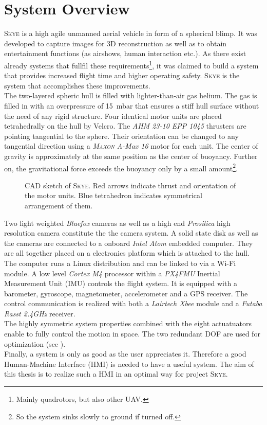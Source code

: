 \section{System Overview}
\label{sec:system overview}
\textsc{Skye} is a high agile unmanned aerial vehicle in form of a spherical blimp. It was developed to capture images for 3D reconstruction as well as to obtain entertainment functions (as airshows, human interaction etc.). As there exist already systems that fullfil these requirements\footnote{Mainly quadrotors, but also other UAV.}, it was claimed to build a system that provides increased flight time and higher operating safety. \textsc{Skye} is the system that accomplishes these improvements. \\
The two-layered spheric hull is filled with lighter-than-air gas helium. The gas is filled in with an overpressure of \SI{15}{\milli\bar} that ensures a stiff hull surface without the need of any rigid structure. Four identical motor units are placed tetrahedrally on the hull by Velcro. The \textit{AHM 23-10 EPP 1045} thrusters are pointing tangential to the sphere. Their orientation can be changed to any tangential direction using a \textit{\textsc{Maxon} A-Max 16} motor for each unit. The center of gravity is approximately at the same position as the center of buoyancy. Further on, the gravitational force exceeds the buoyancy only by a small amount\footnote{So the system sinks slowly to ground if turned off.}.
\begin{figure}[H]
    \centering
    \def\svgwidth{0.8\columnwidth}
    
    \caption{CAD sketch of \textsc{Skye}. Red arrows indicate thrust and orientation of the motor units. Blue tetrahedron indicates symmetrical arrangement of them. }
    \label{fig:scene_trajectoryFollowing}
\end{figure}
Two light weighted \textit{Bluefox} cameras as well as a high end \textit{Prosilica} high resolution camera constitute the the camera system. A solid state disk as well as the cameras are connected to a onboard \textit{Intel Atom} embedded computer. They are all together placed on a electronics platform which is attached to the hull. The computer runs a Linux distribution and can be linked to via a Wi-Fi module. A low level \textit{Cortex M4} processor within a \textit{PX4FMU} Inertial Measurement Unit (IMU) controls the flight system. It is equipped with a barometer, gyroscope, magnetometer, accelerometer and a GPS receiver. The control communication is realized with both a \textit{Lairtech Xbee} module and a \textit{Futaba Rasst 2.4GHz} receiver. \\
The highly symmetric system properties combined with the eight actuatuators enable to fully control the motion in space. The two redundant DOF are used for optimization (see \cite{schaffnervu}).  \\
Finally, a system is only as good as the user appreciates it. Therefore a good Human-Machine Interface (HMI) is needed to have a useful system. The aim of this thesis is to realize such a HMI in an optimal way for project \textsc{Skye}.
